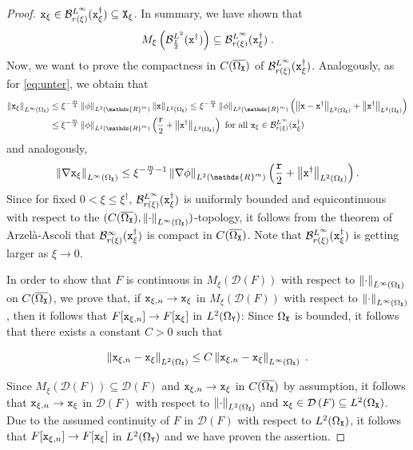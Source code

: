 \documentclass[10pt]{article}
\numberwithin{equation}{section}
\theoremstyle{nonumberplain}
\newtheorem{proof}{Proof}
\newcommand{\R}{\mathds{R}}
\newcommand{\dom}[1]{\mathcal{D}\left(#1\right)}
\newcommand{\norm}[1]{\left\|#1\right\|}
\newcommand{\X}{{\tt X}}
\newcommand{\Y}{{\tt Y}}
\newcommand{\x}{{\tt x}}
\newcommand{\xdag}{\x^\dagger}
\begin{document}
\begin{proof}
$\x_\xi \in \mathcal{B}_{r(\xi)}^{L^\infty}(\xdag_\xi) \subseteq \X_\xi$. In summary, we have shown that
\begin{equation} \label{eq:helpthml2}
M_\xi\left(\mathcal{B}_{\frac{\tt r}{2}}^{L^2}(\xdag)\right) \subseteq \mathcal{B}_{r(\xi)}^{L^\infty}(\xdag_\xi)\;.
\end{equation}
Now, we want to prove the compactness in $C(\overline{\Omega_\X})$ of $\mathcal{B}_{r(\xi)}^{L^\infty}(\xdag_\xi)$. Analogously, as for \autoref{eq:unter}, we obtain that 
\begin{align*}
\norm{\x_\xi}_{L^\infty(\Omega_\X)} &\leq \xi^{-\frac{m}{2}} \norm{\phi}_{L^2(\R^m)} \norm{\x}_{L^2(\Omega_\X)} \leq \xi^{-\frac{m}{2}} \norm{\phi}_{L^2(\R^m)} \left(\norm{\x - \xdag}_{L^2(\Omega_\X)} + \norm{\xdag}_{L^2(\Omega_\X)}\right) \\
&\leq \xi^{-\frac{m}{2}} \norm{\phi}_{L^2(\R^m)} \left(\frac{\tt r}{2} + \norm{\xdag}_{L^2(\Omega_\X)}\right) \text{ for all } \x_\xi \in \mathcal{B}_{r(\xi)}^{L^\infty}(\xdag_\xi)
\end{align*}
and analogously,
\begin{align*}
\norm{\nabla\x_\xi}_{L^\infty(\Omega_\X)} \leq \xi^{-\frac{m}{2}-1} \norm{\nabla\phi}_{L^2(\R^m)} \left(\frac{\tt r}{2} + \norm{\xdag}_{L^2(\Omega_\X)}\right).
\end{align*}
Since for fixed $0 < \xi \leq \xi^\dagger$, $\mathcal{B}_{r(\xi)}^{L^\infty}(\xdag_\xi)$ is uniformly bounded and equicontinuous with respect to the $(C(\overline{\Omega_\X}),\norm{\cdot}_{L^\infty(\Omega_\X)})$-topology, it follows from the theorem of Arzel\`a-Ascoli \cite{Rud76} that $\mathcal{B}_{r(\xi)}^{\infty}(\xdag_\xi)$ is compact in $C(\overline{\Omega_\X})$. Note that $\mathcal{B}_{r(\xi)}^{L^\infty}(\xdag_\xi)$ is getting larger as $\xi \to 0$.


In order to show that $F$ is continuous in $M_{\xi}(\dom{F})$ with respect to $\norm{\cdot}_{L^\infty(\Omega_\X)}$ on $C(\overline{\Omega_\X})$, we prove that, if $\x_{\xi,n} \to \x_\xi$ in $M_\xi(\dom{F})$ with respect to $\norm{\cdot}_{L^\infty(\Omega_\X)}$, then it follows that $F[\x_{\xi,n}] \to F[\x_\xi]$ in $L^2(\Omega_\Y)$: Since $\Omega_\X$ is bounded, it follows that there exists a constant $C>0$ such that

$$\norm{\x_{\xi,n} - \x_\xi}_{L^2(\Omega_\X)} \leq C \norm{\x_{\xi,n} - \x_\xi}_{L^\infty(\Omega_\X)}\;.$$

Since $M_\xi(\dom{F}) \subseteq \dom{F}$ and $\x_{\xi,n} \to \x_\xi$ in $C(\overline{\Omega_\X})$ by assumption, it follows that $\x_{\xi,n} \to \x_\xi$ in $\dom{F}$ with respect to $\norm{\cdot}_{L^2(\Omega_\X)}$ and  $\x_\xi \in \dom{F} \subseteq L^2(\Omega_\X)$. Due to the assumed continuity of $F$ in $\dom{F}$ with respect to $L^2(\Omega_\X)$, it follows that $F[\x_{\xi,n}] \to F[\x_\xi]$ in $L^2(\Omega_\Y)$ and we have proven the assertion.


\end{proof}
\end{document}
